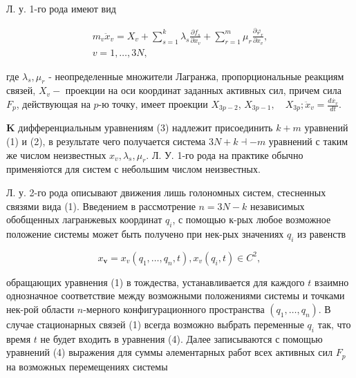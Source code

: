 \documentclass[10pt]{article}
\begin{document}
Л. у. 1-го рода имеют вид



\[

\begin{gathered}

m_{v} \ddot{x}_{v}=X_{v}+\sum_{s=1}^{k} \lambda_{s} \frac{\partial f_{s}}{\partial x_{v}}+\sum_{r=1}^{m} \mu_{r} \frac{\partial \varphi_{r}}{\partial \dot{x}_{v}}, \\

v=1, \ldots, 3 N,

\end{gathered}

\]



где $\lambda_{s}, \mu_{r}$ - неопределенные множители Лагранжа, пропорциональные реакциям связей, $X_{v}-$ проекции на оси координат заданных активных сил, причем сила $F_{p}$, действующая на $p$-ю точку, имеет проекции $X_{3 p-2}$, $X_{3 p-1}, \quad X_{3 p} ; \ddot{x}_{v}=\frac{d \dot{x_{v}}}{d t}$.



$\mathbf{K}$ дифференциальным уравнениям (3) надлежит присоединить $k+m$ уравнений (1) и (2), в результате чего получается система $3 N+k \dashv-m$ уравнений с таким же числом неизвестных $x_{v}, \lambda_{s}, \mu_{r}$. Л. У. 1-го рода на практике обычно применяіотся для систем с небольшим числом неизвестных.



Л. у. 2-го рода описывают движения лишь голономных систем, стесненных связями вида (1). Введением в рассмотрение $n=3 N-k$ независимых обобщенных лагранжевых координат $q_{i}$, с помощью к-рых любое возможное положение системы может быть получено при нек-рых значениях $q_{i}$ из равенств



\[

x_{\boldsymbol{v}}=x_{v}\left(q_{1}, \ldots, q_{n}, t\right), x_{v}\left(q_{i}, t\right) \in C^{2} \text {, }

\]



обращающих уравнения (1) в тождества, устанавливается для каждого $t$ взаимно однозначное соответствие между возможными положениями системы и точками нек-рой области $n$-мерного конфигурационного пространства $\left(q_{1}, \ldots, q_{n}\right)$. В случае стационарных связей (1) всегда возможно выбрать переменные $q_{i}$ так, что время $t$ не будет входить в уравнения (4). Далее записываются с помощью уравнений (4) выражения для суммы әлементарных работ всех активных сил $F_{p}$ на возможных перемещениях системы
\end{document}

